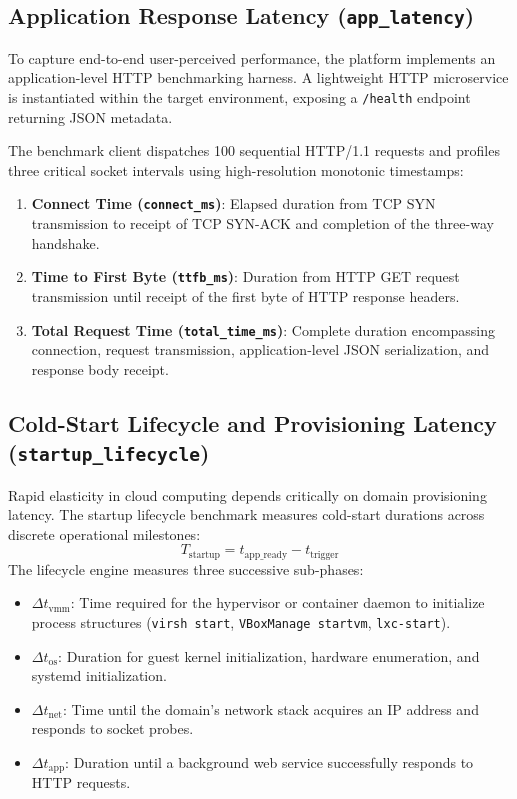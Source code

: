 \subsection{Application Response Latency (\texttt{app\_latency})}
\label{subsec:app_latency_methodology}

To capture end-to-end user-perceived performance, the platform implements an application-level HTTP benchmarking harness. A lightweight HTTP microservice is instantiated within the target environment, exposing a \texttt{/health} endpoint returning JSON metadata.

The benchmark client dispatches 100 sequential HTTP/1.1 requests and profiles three critical socket intervals using high-resolution monotonic timestamps:
\begin{enumerate}
    \item \textbf{Connect Time (\texttt{connect\_ms})}: Elapsed duration from TCP SYN transmission to receipt of TCP SYN-ACK and completion of the three-way handshake.
    \item \textbf{Time to First Byte (\texttt{ttfb\_ms})}: Duration from HTTP GET request transmission until receipt of the first byte of HTTP response headers.
    \item \textbf{Total Request Time (\texttt{total\_time\_ms})}: Complete duration encompassing connection, request transmission, application-level JSON serialization, and response body receipt.
\end{enumerate}

\subsection{Cold-Start Lifecycle and Provisioning Latency (\texttt{startup\_lifecycle})}
\label{subsec:startup_methodology}

Rapid elasticity in cloud computing depends critically on domain provisioning latency. The startup lifecycle benchmark measures cold-start durations across discrete operational milestones:
\begin{equation}
    T_{\text{startup}} = t_{\text{app\_ready}} - t_{\text{trigger}}
\end{equation}
The lifecycle engine measures three successive sub-phases:
\begin{itemize}
    \item $\Delta t_{\text{vmm}}$: Time required for the hypervisor or container daemon to initialize process structures (\texttt{virsh start}, \texttt{VBoxManage startvm}, \texttt{lxc-start}).
    \item $\Delta t_{\text{os}}$: Duration for guest kernel initialization, hardware enumeration, and systemd initialization.
    \item $\Delta t_{\text{net}}$: Time until the domain's network stack acquires an IP address and responds to socket probes.
    \item $\Delta t_{\text{app}}$: Duration until a background web service successfully responds to HTTP requests.
\end{itemize}

